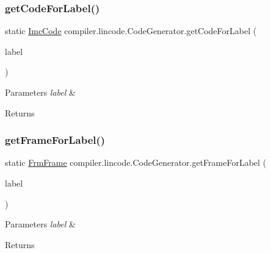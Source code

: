 \subsubsection{\texorpdfstring{get\+Code\+For\+Label()}{getCodeForLabel()}}
{\footnotesize\ttfamily static \hyperlink{interfacecompiler_1_1imcode_1_1_imc_code}{Imc\+Code} compiler.\+lincode.\+Code\+Generator.\+get\+Code\+For\+Label (\begin{DoxyParamCaption}\item[{\hyperlink{classcompiler_1_1frames_1_1_frm_label}{Frm\+Label}}]{label }\end{DoxyParamCaption})\hspace{0.3cm}{\ttfamily [static]}}


\begin{DoxyParams}{Parameters}
{\em label} & \\
\hline
\end{DoxyParams}
\begin{DoxyReturn}{Returns}

\end{DoxyReturn}
\mbox{\label{classcompiler_1_1lincode_1_1_code_generator_a50a5eb8c751616ca66441a5f7a6eeebb}} 
\subsubsection{\texorpdfstring{get\+Frame\+For\+Label()}{getFrameForLabel()}}
{\footnotesize\ttfamily static \hyperlink{classcompiler_1_1frames_1_1_frm_frame}{Frm\+Frame} compiler.\+lincode.\+Code\+Generator.\+get\+Frame\+For\+Label (\begin{DoxyParamCaption}\item[{\hyperlink{classcompiler_1_1frames_1_1_frm_label}{Frm\+Label}}]{label }\end{DoxyParamCaption})\hspace{0.3cm}{\ttfamily [static]}}


\begin{DoxyParams}{Parameters}
{\em label} & \\
\hline
\end{DoxyParams}
\begin{DoxyReturn}{Returns}

\end{DoxyReturn}
\mbox{\label{classcompiler_1_1lincode_1_1_code_generator_afd4e9211f3d4ddf920c243579d941803}} 
